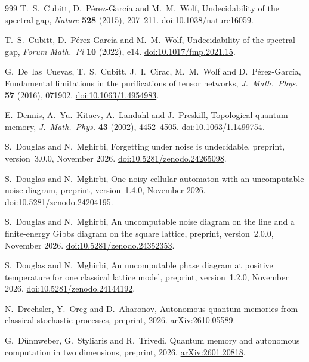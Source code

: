 \begin{thebibliography}{999}
T.~S.~Cubitt, D.~P\'erez-Garc\'ia and M.~M.~Wolf,
Undecidability of the spectral gap,
\emph{Nature} \textbf{528} (2015), 207--211.
\href{https://doi.org/10.1038/nature16059}{doi:10.1038/nature16059}.

T.~S.~Cubitt, D.~P\'erez-Garc\'ia and M.~M.~Wolf,
Undecidability of the spectral gap,
\emph{Forum Math.~Pi} \textbf{10} (2022), e14.
\href{https://doi.org/10.1017/fmp.2021.15}{doi:10.1017/fmp.2021.15}.

G.~De~las~Cuevas, T.~S.~Cubitt, J.~I.~Cirac, M.~M.~Wolf and D.~P\'erez-Garc\'ia,
Fundamental limitations in the purifications of tensor networks,
\emph{J.~Math.~Phys.} \textbf{57} (2016), 071902.
\href{https://doi.org/10.1063/1.4954983}{doi:10.1063/1.4954983}.

E.~Dennis, A.~Yu.~Kitaev, A.~Landahl and J.~Preskill,
Topological quantum memory,
\emph{J.~Math.~Phys.} \textbf{43} (2002), 4452--4505.
\href{https://doi.org/10.1063/1.1499754}{doi:10.1063/1.1499754}.

S.~Douglas and N.~Mghirbi,
Forgetting under noise is undecidable,
preprint, version~3.0.0, November 2026.
\href{https://doi.org/10.5281/zenodo.24265098}{doi:10.5281/zenodo.24265098}.

S.~Douglas and N.~Mghirbi,
One noisy cellular automaton with an uncomputable noise diagram,
preprint, version~1.4.0, November 2026.
\href{https://doi.org/10.5281/zenodo.24204195}{doi:10.5281/zenodo.24204195}.

S.~Douglas and N.~Mghirbi,
An uncomputable noise diagram on the line and a finite-energy Gibbs diagram on the square lattice,
preprint, version~2.0.0, November 2026.
\href{https://doi.org/10.5281/zenodo.24352353}{doi:10.5281/zenodo.24352353}.

S.~Douglas and N.~Mghirbi,
An uncomputable phase diagram at positive temperature for one classical lattice model,
preprint, version~1.2.0, November 2026.
\href{https://doi.org/10.5281/zenodo.24144192}{doi:10.5281/zenodo.24144192}.

N.~Drechsler, Y.~Oreg and D.~Aharonov,
Autonomous quantum memories from classical stochastic processes,
preprint, 2026.
\href{https://arxiv.org/abs/2610.05589}{arXiv:2610.05589}.

G.~D\"unnweber, G.~Styliaris and R.~Trivedi,
Quantum memory and autonomous computation in two dimensions,
preprint, 2026.
\href{https://arxiv.org/abs/2601.20818}{arXiv:2601.20818}.


\end{thebibliography}
